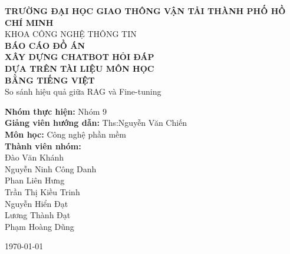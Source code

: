 \documentclass[12pt,a4paper]{report}
\begin{document}
	
	\begin{titlepage}
		\centering
		
		\vspace*{1cm}
		
		{\Large \textbf{TRƯỜNG ĐẠI HỌC GIAO THÔNG VẬN TẢI THÀNH PHỐ HỒ CHÍ MINH}}\\[0.5cm]
		
		{\large KHOA CÔNG NGHỆ THÔNG TIN}\\[1cm]
		
		{\Huge \textbf{BÁO CÁO ĐỒ ÁN}}\\[1cm]
		
		{\LARGE
			\textbf{
				XÂY DỰNG CHATBOT HỎI ĐÁP\\
				DỰA TRÊN TÀI LIỆU MÔN HỌC\\
				BẰNG TIẾNG VIỆT
		}}\\[1cm]
		
		{\Large
			So sánh hiệu quả giữa RAG và Fine-tuning
		}
		
		\vfill
		
		\begin{flushleft}
			\textbf{Nhóm thực hiện:} Nhóm 9\\
			\textbf{Giảng viên hướng dẫn:} Ths:Nguyễn Văn Chiến\\
			\textbf{Môn học:} Công nghệ phần mềm\\
			\textbf{Thành viên nhóm:} \\
			                 Đào Văn Khánh\\
		                    Nguyễn Ninh Công Danh\\
		                  	Phan Liên Hưng\\
		                  	Trần Thị Kiều Trinh\\
		                  	Nguyễn Hiển Đạt\\
		                  	Lương Thành Đạt\\
		                  	Phạm Hoàng Dũng\\
		                 
		                  
		\end{flushleft}
		
		\vspace{2cm}
		
		{\large \today}
		
	\end{titlepage}
	
	\tableofcontents
	\newpage
	
\end{document}
